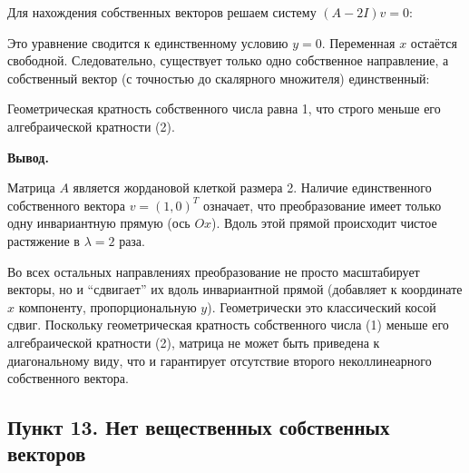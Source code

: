 \documentclass[a4paper,14pt]{extarticle}
\begin{document}
Для нахождения собственных векторов решаем систему \((A - 2I)v = 0\):
\begin{center}\end{center}

Это уравнение сводится к единственному условию \(y = 0\). Переменная
\(x\) остаётся свободной. Следовательно, существует только одно
собственное направление, а собственный вектор (с точностью до скалярного
множителя) единственный: \begin{center}\end{center}

Геометрическая кратность собственного числа равна 1, что строго меньше
его алгебраической кратности (2).

\textbf{Вывод.}

Матрица \(A\) является жордановой клеткой размера 2. Наличие
единственного собственного вектора \(v = (1, 0)^T\) означает, что
преобразование имеет только одну инвариантную прямую (ось \(Ox\)). Вдоль
этой прямой происходит чистое растяжение в \(\lambda = 2\) раза.

Во всех остальных направлениях преобразование не просто масштабирует
векторы, но и ``сдвигает'' их вдоль инвариантной прямой (добавляет к
координате \(x\) компоненту, пропорциональную \(y\)). Геометрически это
классический косой сдвиг. Поскольку геометрическая кратность
собственного числа (1) меньше его алгебраической кратности (2), матрица
не может быть приведена к диагональному виду, что и гарантирует
отсутствие второго неколлинеарного собственного вектора.

\hypertarget{ux43fux443ux43dux43aux442-13.-ux43dux435ux442-ux432ux435ux449ux435ux441ux442ux432ux435ux43dux43dux44bux445-ux441ux43eux431ux441ux442ux432ux435ux43dux43dux44bux445-ux432ux435ux43aux442ux43eux440ux43eux432}{%
\subsection{Пункт 13. Нет вещественных собственных
векторов}\label{ux43fux443ux43dux43aux442-13.-ux43dux435ux442-ux432ux435ux449ux435ux441ux442ux432ux435ux43dux43dux44bux445-ux441ux43eux431ux441ux442ux432ux435ux43dux43dux44bux445-ux432ux435ux43aux442ux43eux440ux43eux432}}
\end{document}
